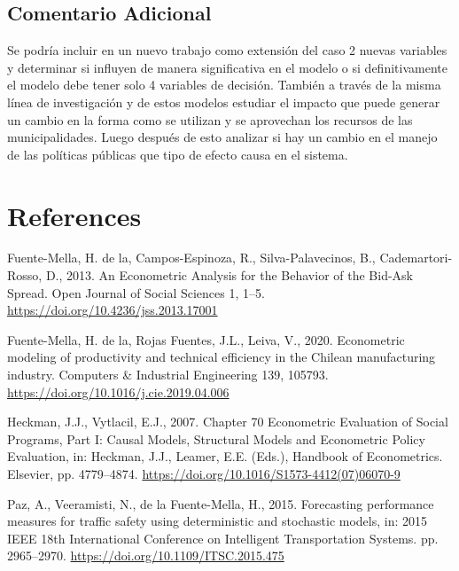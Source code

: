 \documentclass[
  british,
]{article}
\begin{document}
\hypertarget{comentario-adicional}{%
\subsection{Comentario Adicional}\label{comentario-adicional}}

Se podría incluir en un nuevo trabajo como extensión del caso 2 nuevas
variables y determinar si influyen de manera significativa en el modelo
o si definitivamente el modelo debe tener solo 4 variables de decisión.
También a través de la misma línea de investigación y de estos modelos
estudiar el impacto que puede generar un cambio en la forma como se
utilizan y se aprovechan los recursos de las municipalidades. Luego
después de esto analizar si hay un cambio en el manejo de las políticas
públicas que tipo de efecto causa en el sistema.

\hypertarget{references}{%
\section*{References}\label{references}}

\hypertarget{refs}{}
\leavevmode\hypertarget{ref-fuente-mella_econometric_2013}{}%
Fuente-Mella, H. de la, Campos-Espinoza, R., Silva-Palavecinos, B.,
Cademartori-Rosso, D., 2013. An Econometric Analysis for the Behavior of
the Bid-Ask Spread. Open Journal of Social Sciences 1, 1--5.
\url{https://doi.org/10.4236/jss.2013.17001}

\leavevmode\hypertarget{ref-de_la_fuente-mella_econometric_2020}{}%
Fuente-Mella, H. de la, Rojas Fuentes, J.L., Leiva, V., 2020.
Econometric modeling of productivity and technical efficiency in the
Chilean manufacturing industry. Computers \& Industrial Engineering 139,
105793. \url{https://doi.org/10.1016/j.cie.2019.04.006}

\leavevmode\hypertarget{ref-heckman_chapter_2007}{}%
Heckman, J.J., Vytlacil, E.J., 2007. Chapter 70 Econometric Evaluation
of Social Programs, Part I: Causal Models, Structural Models and
Econometric Policy Evaluation, in: Heckman, J.J., Leamer, E.E. (Eds.),
Handbook of Econometrics. Elsevier, pp. 4779--4874.
\url{https://doi.org/10.1016/S1573-4412(07)06070-9}

\leavevmode\hypertarget{ref-paz_forecasting_2015}{}%
Paz, A., Veeramisti, N., de la Fuente-Mella, H., 2015. Forecasting
performance measures for traffic safety using deterministic and
stochastic models, in: 2015 IEEE 18th International Conference on
Intelligent Transportation Systems. pp. 2965--2970.
\url{https://doi.org/10.1109/ITSC.2015.475}
\end{document}
